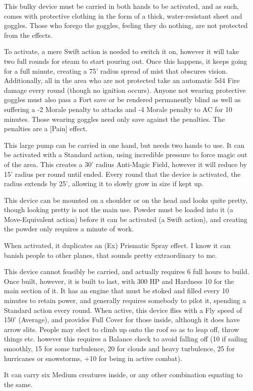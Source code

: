 {This bulky device must be carried in both hands to be activated, and as such, comes with protective clothing in the form of a thick, water-resistant sheet and goggles. Those who forego the goggles, feeling they do nothing, are not protected from the effects.\medskip

\noindent To activate, a mere Swift action is needed to switch it on, however it will take two full rounds for steam to start pouring out. Once this happens, it keeps going for a full minute, creating a 75' radius spread of mist that obscures vision. Additionally, all in the area who are not protected take an automatic 5d4 Fire damage every round (though no ignition occurs). Anyone not wearing protective goggles must also pass a Fort save or be rendered permanently blind as well as suffering a -2 Morale penalty to attacks and -4 Morale penalty to AC for 10 minutes. Those wearing goggles need only save against the penalties. The penalties are a [Pain] effect.}

{This large pump can be carried in one hand, but needs two hands to use. It can be activated with a Standard action, using incredible pressure to force magic out of the area. This creates a 30' radius Anti-Magic Field, however it will reduce by 15' radius per round until ended. Every round that the device is activated, the radius extends by 25', allowing it to slowly grow in size if kept up.}

{This device can be mounted on a shoulder or on the head and looks quite pretty, though looking pretty is not the main use. Powder must be loaded into it (a Move-Equivalent action) before it can be activated (a Swift action), and creating the powder only requires a minute of work.\medskip

\noindent When activated, it duplicates an (Ex) Prismatic Spray effect. I know it can banish people to other planes, that sounds pretty extraordinary to me.}

{This device cannot feasibly be carried, and actually requires 6 full hours to build. Once built, however, it is built to last, with 300 HP and Hardness 10 for the main section of it. It has an engine that must be stoked and filled every 10 minutes to retain power, and generally requires somebody to pilot it, spending a Standard action every round. When active, this device flies with a Fly speed of 150' (Average), and provides Full Cover for those inside, although it does have arrow slits. People may elect to climb up onto the roof so as to leap off, throw things etc. however this requires a Balance check to avoid falling off (10 if sailing smoothly, 15 for some turbulence, 20 for clouds and heavy turbulence, 25 for hurricanes or snowstorms, +10 for being in active combat).\medskip

\noindent It can carry six Medium creatures inside, or any other combination equating to the same.}

